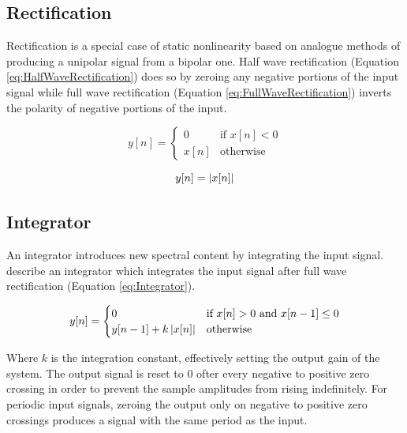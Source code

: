 	\subsection{Rectification}
	\label{sec:Excitation-Methods-Rectification}
		Rectification is a special case of static nonlinearity based on analogue methods of producing a unipolar
		signal from a bipolar one. Half wave rectification (Equation \ref{eq:HalfWaveRectification}) does so by
		zeroing any negative portions of the input signal while full wave rectification (Equation
		\ref{eq:FullWaveRectification}) inverts the polarity of negative portions of the input.

		\begin{equation}
			y[n] = \begin{cases}
				0 & \text{if $x[n] < 0$} \\
				x[n] & \text{otherwise}
			\end{cases}
			\label{eq:HalfWaveRectification}
		\end{equation}

		\begin{equation}
			y[n] = \left|x[n]\right|
			\label{eq:FullWaveRectification}
		\end{equation}

	\subsection{Integrator}
	\label{sec:Excitation-Methods-Integrator}
		An integrator introduces new spectral content by integrating the input signal. \citet{larsen2004audio}
		describe an integrator which integrates the input signal after full wave rectification (Equation
		\ref{eq:Integrator}).

		\begin{equation}
			y[n] = \begin{cases}
				0 & \text{if $x[n] > 0$ and $x[n - 1] \leq 0$} \\
				y[n - 1] + k\left|x[n]\right| & \text{otherwise}
			\end{cases}
			\label{eq:Integrator}
		\end{equation}

		Where $k$ is the integration constant, effectively setting the output gain of the system. The output signal
		is reset to 0 ofter every negative to positive zero crossing in order to prevent the sample amplitudes from
		rising indefinitely. For periodic input signals, zeroing the output only on negative to positive zero
		crossings produces a signal with the same period as the input.

